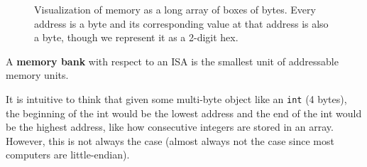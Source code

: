 \begin{figure}[H]
    \caption{Visualization of memory as a long array of boxes of bytes. Every address is a byte and its corresponding value at that address is also a byte, though we represent it as a 2-digit hex. } 
    \label{fig:memory_visual_byte}
  \end{figure}

  \begin{definition}
    A \textbf{memory bank} with respect to an ISA is the smallest unit of addressable memory units. 
  \end{definition}

  It is intuitive to think that given some multi-byte object like an \texttt{int} (4 bytes), the beginning of the int would be the lowest address and the end of the int would be the highest address, like how consecutive integers are stored in an array. However, this is not always the case (almost always not the case since most computers are little-endian).  

